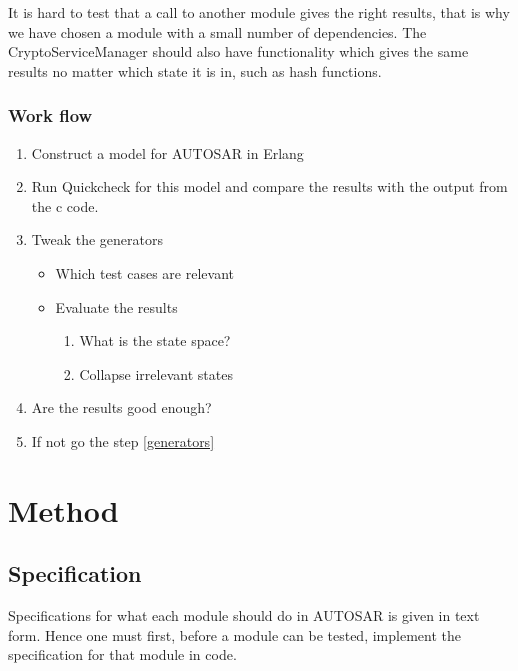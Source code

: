 \documentclass[11pt,a4paper]{report}
\begin{document}
It is hard to test that a call to another module gives the right results,
that is why we have chosen a module with a small number of
dependencies.
The CryptoServiceManager should also have functionality which gives the same
results no matter which state it is in, such as hash
functions\cite{SPEC:AUTOSAR:CSM}.

\subsection{Work flow}

\begin{enumerate}

\item Construct a model for AUTOSAR in Erlang
\item Run Quickcheck for this model and compare the results with the output from
the c code.
\item Tweak the generators \label{generators}
  \begin{itemize}
    \item Which test cases are relevant
    \item Evaluate the results
    \begin{enumerate}
      \item What is the state space?
      \item Collapse irrelevant states
    \end{enumerate}
  \end{itemize}
\item Are the results good enough?
\item If not go the step \ref{generators}
\end{enumerate}

\chapter{Method}
\section{Specification}
Specifications for what each module should do in AUTOSAR is given in text form.
Hence one must first, before a module can be tested, implement the specification
for that module in code.
\end{document}
